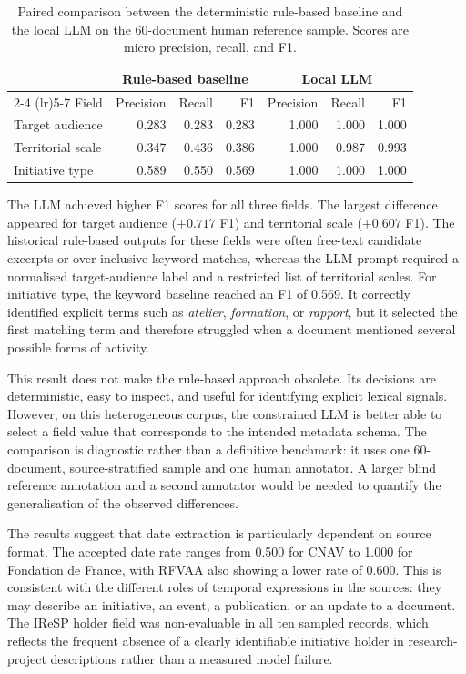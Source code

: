 \documentclass[
11pt,
english,
singlespacing,
headsepline,
]{MastersDoctoralThesis}
\begin{document}
\begin{table}[H]
\centering
\small
\begin{tabular}{lrrrrrr}
\toprule
& \multicolumn{3}{c}{Rule-based baseline} & \multicolumn{3}{c}{Local LLM} \\
\cmidrule(lr){2-4} \cmidrule(lr){5-7}
Field & Precision & Recall & F1 & Precision & Recall & F1 \\
\midrule
Target audience & 0.283 & 0.283 & 0.283 & 1.000 & 1.000 & 1.000 \\
Territorial scale & 0.347 & 0.436 & 0.386 & 1.000 & 0.987 & 0.993 \\
Initiative type & 0.589 & 0.550 & 0.569 & 1.000 & 1.000 & 1.000 \\
\bottomrule
\end{tabular}
\caption{Paired comparison between the deterministic rule-based baseline and
the local LLM on the 60-document human reference sample. Scores are micro
precision, recall, and F1.}
\label{tab:rule-based-llm-comparison}
\end{table}

The LLM achieved higher F1 scores for all three fields. The largest difference
appeared for target audience ($+0.717$ F1) and territorial scale ($+0.607$ F1).
The historical rule-based outputs for these fields were often free-text
candidate excerpts or over-inclusive keyword matches, whereas the LLM prompt
required a normalised target-audience label and a restricted list of territorial
scales. For initiative type, the keyword baseline reached an F1 of 0.569. It
correctly identified explicit terms such as \textit{atelier}, \textit{formation},
or \textit{rapport}, but it selected the first matching term and therefore
struggled when a document mentioned several possible forms of activity.

This result does not make the rule-based approach obsolete. Its decisions are
deterministic, easy to inspect, and useful for identifying explicit lexical
signals. However, on this heterogeneous corpus, the constrained LLM is better
able to select a field value that corresponds to the intended metadata schema.
The comparison is diagnostic rather than a definitive benchmark: it uses one
60-document, source-stratified sample and one human annotator. A larger blind
reference annotation and a second annotator would be needed to quantify the
generalisation of the observed differences.

The results suggest that date extraction is particularly dependent on source
format. The accepted date rate ranges from 0.500 for CNAV to 1.000 for
Fondation de France, with RFVAA also showing a lower rate of 0.600. This is
consistent with the different roles of temporal expressions in the sources:
they may describe an initiative, an event, a publication, or an update to a
document. The IReSP holder field was non-evaluable in all ten sampled records,
which reflects the frequent absence of a clearly identifiable initiative holder
in research-project descriptions rather than a measured model failure.
\end{document}
